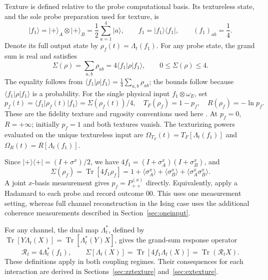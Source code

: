 \documentclass[11pt,a4paper]{article}
\newcommand{\ket}[1]{\lvert #1\rangle}
\newcommand{\bra}[1]{\langle #1\rvert}
\newcommand{\Tr}{\operatorname{Tr}}
\newcommand{\OmF}{\Omega_{T_F}}
\newcommand{\OmR}{\Omega_R}
\begin{document}
Texture is defined relative to the probe computational basis. Its
textureless state, and the sole probe preparation used for texture, is
\begin{equation}
 \ket{f_1}=\ket+_A\otimes\ket+_B
 =\frac12\sum_{a=1}^4\ket a,\qquad
 f_1=\ket{f_1}\bra{f_1},\qquad (f_1)_{ab}=\frac14.
 \label{eq:f1}
\end{equation}
Denote its full output state by $\rho_f(t)=\Lambda_t(f_1)$. For any
probe state, the grand sum is real and satisfies
\begin{equation}
 \Sigma(\rho)=\sum_{a,b}\rho_{ab}=4\bra{f_1}\rho\ket{f_1},
 \qquad 0\le\Sigma(\rho)\le4.
\end{equation}
The equality follows from $\bra{f_1}\rho\ket{f_1}=\frac14\sum_{a,b}\rho_{ab}$;
the bounds follow because $\bra{f_1}\rho\ket{f_1}$ is a probability.
For the single physical input $f_1\otimes\omega_E$, set
\begin{equation}
 p_f(t)=\bra{f_1}\rho_f(t)\ket{f_1}=\Sigma(\rho_f(t))/4,
 \quad T_F(\rho_f)=1-p_f,\quad R(\rho_f)=-\ln p_f.
 \label{eq:textures}
\end{equation}
These are the fidelity texture and rugosity conventions used here
\cite{Parisio2024,Vieira2026}. At $p_f=0$, $R=+\infty$; initially
$p_f=1$ and both textures vanish. The texturizing powers evaluated on
the unique textureless input are $\OmF(t)=T_F[\Lambda_t(f_1)]$ and
$\OmR(t)=R[\Lambda_t(f_1)]$.

Since $\ket+\bra+=(I+\sigma^x)/2$, we have $4f_1=(I+\sigma_A^x)(I+\sigma_B^x)$, and
\begin{equation}
 \Sigma(\rho_f)=\Tr[4f_1\rho_f]=1+\langle\sigma_A^x\rangle
 +\langle\sigma_B^x\rangle+\langle\sigma_A^x\sigma_B^x\rangle.
 \label{eq:measurement}
\end{equation}
A joint $x$-basis measurement gives $p_f=P_{++}^{(x)}$ directly.
Equivalently, apply a Hadamard to each probe and record outcome $00$.
This uses one measurement setting, whereas full channel reconstruction
in the Ising case uses the additional coherence measurements described
in Section~\ref{sec:oneinput}.

For any channel, the dual map $\Lambda_t^*$, defined by
$\Tr[Y\Lambda_t(X)]=\Tr[\Lambda_t^*(Y)X]$, gives the grand-sum response operator
\begin{equation}
 \mathcal R_t=4\Lambda_t^*(f_1),\qquad
 \Sigma[\Lambda_t(X)]=\Tr[4f_1\Lambda_t(X)]=\Tr(\mathcal R_tX).
 \label{eq:response}
\end{equation}
These definitions apply in both coupling regimes. Their consequences
for each interaction are derived in Sections~\ref{sec:zztexture}
and~\ref{sec:extexture}.
\end{document}
